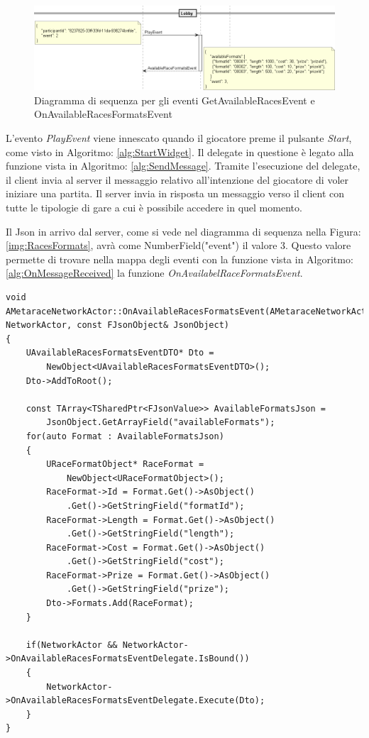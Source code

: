         \begin{figure}[t]\label{img:RacesFormats}
            \centering
            \includegraphics[width=14.5cm]{figure/RacesFormats.png}
            \caption{Diagramma di sequenza per gli eventi GetAvailableRacesEvent e OnAvailableRacesFormatsEvent}
            \label{img:PlayEvent}
        \end{figure}

        L'evento \textit{PlayEvent} viene innescato quando il giocatore preme il pulsante \textit{Start}, come visto in Algoritmo: \ref{alg:StartWidget}.
        Il delegate in questione è legato alla funzione vista in Algoritmo: \ref{alg:SendMessage}.
        Tramite l'esecuzione del delegate, il client invia al server il messaggio relativo all'intenzione del giocatore di voler iniziare una partita.
        Il server invia in risposta un messaggio verso il client con tutte le tipologie di gare a cui è possibile accedere in quel momento.

        Il Json in arrivo dal server, come si vede nel diagramma di sequenza nella Figura: \ref{img:RacesFormats}, avrà come NumberField("event") il valore 3.
        Questo valore permette di trovare nella mappa degli eventi con la funzione vista in Algoritmo:\ref{alg:OnMessageReceived} la funzione \textit{OnAvailabelRaceFormatsEvent}.

        \begin{lstlisting}[caption = Funzione OnAvailabelRaceFormatsEvent, label = {alg:OnAvailabelRaceFormatsEvent}]
void AMetaraceNetworkActor::OnAvailableRacesFormatsEvent(AMetaraceNetworkActor* NetworkActor, const FJsonObject& JsonObject)
{
    UAvailableRacesFormatsEventDTO* Dto = 
        NewObject<UAvailableRacesFormatsEventDTO>();
    Dto->AddToRoot();

    const TArray<TSharedPtr<FJsonValue>> AvailableFormatsJson = 
        JsonObject.GetArrayField("availableFormats");
    for(auto Format : AvailableFormatsJson)
    {
        URaceFormatObject* RaceFormat = 
            NewObject<URaceFormatObject>();
        RaceFormat->Id = Format.Get()->AsObject()
            .Get()->GetStringField("formatId");
        RaceFormat->Length = Format.Get()->AsObject()
            .Get()->GetStringField("length");
        RaceFormat->Cost = Format.Get()->AsObject()
            .Get()->GetStringField("cost");
        RaceFormat->Prize = Format.Get()->AsObject()
            .Get()->GetStringField("prize");
        Dto->Formats.Add(RaceFormat);		
    }

    if(NetworkActor && NetworkActor->OnAvailableRacesFormatsEventDelegate.IsBound())
    {
        NetworkActor->OnAvailableRacesFormatsEventDelegate.Execute(Dto);
    }
}
        \end{lstlisting}

